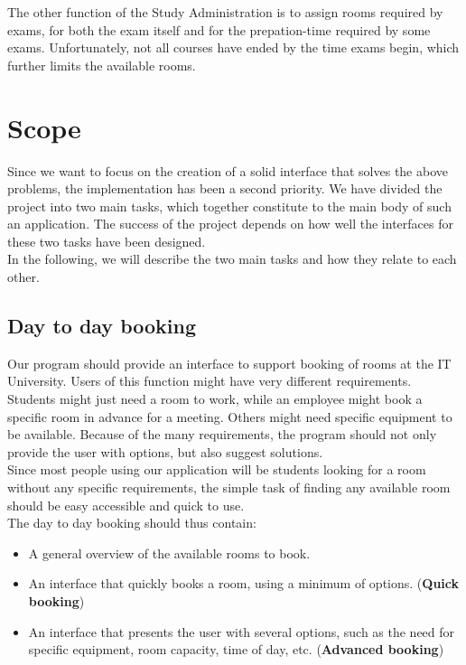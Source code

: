 The other function of the Study Administration is to assign rooms required by exams, for both the exam itself and for the prepation-time required by some exams. Unfortunately, not all courses have ended by the time exams begin, which further limits the available rooms.\\

\label{sec:scope}
\section{Scope}
 Since we want to focus on the creation of a solid interface that solves the above problems, the implementation has been a second priority. We have divided the project into two main tasks, which together constitute to the main body of such an application. The success of the project depends on how well the interfaces for these two tasks have been designed.\\
In the following, we will describe the two main tasks and how they relate to each other.

\subsection{Day to day booking}
Our program should provide an interface to support booking of rooms at the IT University. Users of this function might have very different requirements. Students might just need a room to work, while an employee might book a specific room in advance for a meeting. Others might need specific equipment to be available. Because of the many requirements, the program should not only provide the user with options, but also suggest solutions.\\
Since most people using our application will be students looking for a room without any specific requirements, the simple task of finding any available room should be easy accessible and quick to use. \\

The day to day booking should thus contain:

\begin{itemize}
	\item A general overview of the available rooms to book.
	\item An interface that quickly books a room, using a minimum of options. (\textbf{Quick booking})
	\item An interface that presents the user with several options, such as the need for specific equipment, room capacity, time of day, etc. (\textbf{Advanced booking})
\end{itemize}

